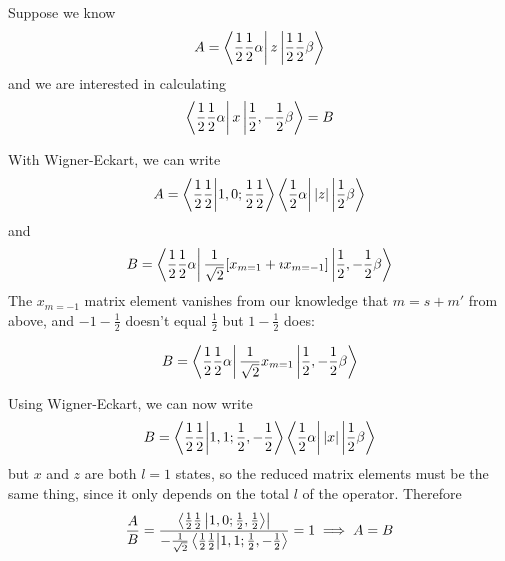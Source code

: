 \documentclass[a4paper,twoside,master.tex]{subfiles}
\begin{document}
Suppose we know
\begin{equation}
    A =\bra{\frac{1}{2} \frac{1}{2} \alpha} z\ket{\frac{1}{2} \frac{1}{2} \beta}
\end{equation}
and we are interested in calculating
\begin{equation}
    \bra{\frac{1}{2} \frac{1}{2} \alpha} x\ket{\frac{1}{2}, - \frac{1}{2} \beta} = B
\end{equation}

With Wigner-Eckart, we can write
\begin{equation}
    A =\bra{\frac{1}{2} \frac{1}{2}}\ket{1,0; \frac{1}{2} \frac{1}{2}}\bra{\frac{1}{2} \alpha} |z|\ket{\frac{1}{2} \beta}
\end{equation}
and
\begin{equation}
    B =\bra{\frac{1}{2} \frac{1}{2} \alpha} \frac{1}{\sqrt{2}} [x_{m=1} + \imath x_{m=-1}]\ket{\frac{1}{2}, - \frac{1}{2} \beta }
\end{equation}
The $ x_{m=-1} $ matrix element vanishes from our knowledge that $ m = s+m' $ from above, and $ -1 - \frac{1}{2} $ doesn't equal $ \frac{1}{2} $ but $ 1 - \frac{1}{2} $ does:

\begin{equation}
    B =\bra{\frac{1}{2} \frac{1}{2} \alpha} \frac{1}{\sqrt{2}}x_{m=1}\ket{\frac{1}{2}, - \frac{1}{2} \beta }
\end{equation}

Using Wigner-Eckart, we can now write
\begin{equation}
    B =\bra{\frac{1}{2} \frac{1}{2}}\ket{1,1; \frac{1}{2}, - \frac{1}{2}}\bra{\frac{1}{2} \alpha} |x|\ket{\frac{1}{2} \beta}
\end{equation}
but $ x $ and $ z $ are both $ l=1 $ states, so the reduced matrix elements must be the same thing, since it only depends on the total $ l $ of the operator. Therefore
\begin{equation}
    \frac{A}{B} = \frac{\bra{\frac{1}{2} \frac{1}{2}\ket{1,0; \frac{1}{2}, \frac{1}{2}}}}{- \frac{1}{\sqrt{2}}\bra{\frac{1}{2} \frac{1}{2}}\ket{1,1; \frac{1}{2}, - \frac{1}{2}}} = 1 \implies A = B
\end{equation}
\end{document}
